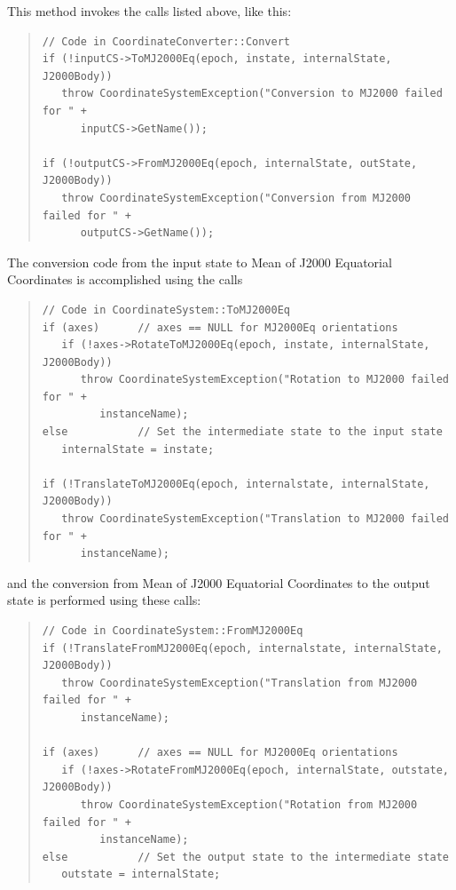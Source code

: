 This method invokes the calls listed above, like this:

\begin{quotation}
\begin{verbatim}
// Code in CoordinateConverter::Convert
if (!inputCS->ToMJ2000Eq(epoch, instate, internalState, J2000Body))
   throw CoordinateSystemException("Conversion to MJ2000 failed for " +
      inputCS->GetName());

if (!outputCS->FromMJ2000Eq(epoch, internalState, outState, J2000Body))
   throw CoordinateSystemException("Conversion from MJ2000 failed for " +
      outputCS->GetName());
\end{verbatim}
\end{quotation}

The conversion code from the input state to Mean of J2000 Equatorial
Coordinates is accomplished using the calls

\begin{quotation}
\begin{verbatim}
// Code in CoordinateSystem::ToMJ2000Eq
if (axes)      // axes == NULL for MJ2000Eq orientations
   if (!axes->RotateToMJ2000Eq(epoch, instate, internalState, J2000Body))
      throw CoordinateSystemException("Rotation to MJ2000 failed for " +
         instanceName);
else           // Set the intermediate state to the input state
   internalState = instate;

if (!TranslateToMJ2000Eq(epoch, internalstate, internalState, J2000Body))
   throw CoordinateSystemException("Translation to MJ2000 failed for " +
      instanceName);
\end{verbatim}
\end{quotation}

and the conversion from Mean of J2000 Equatorial Coordinates to the output state is performed using
these calls:

\begin{quotation}
\begin{verbatim}
// Code in CoordinateSystem::FromMJ2000Eq
if (!TranslateFromMJ2000Eq(epoch, internalstate, internalState, J2000Body))
   throw CoordinateSystemException("Translation from MJ2000 failed for " +
      instanceName);

if (axes)      // axes == NULL for MJ2000Eq orientations
   if (!axes->RotateFromMJ2000Eq(epoch, internalState, outstate, J2000Body))
      throw CoordinateSystemException("Rotation from MJ2000 failed for " +
         instanceName);
else           // Set the output state to the intermediate state
   outstate = internalState;
\end{verbatim}
\end{quotation}

